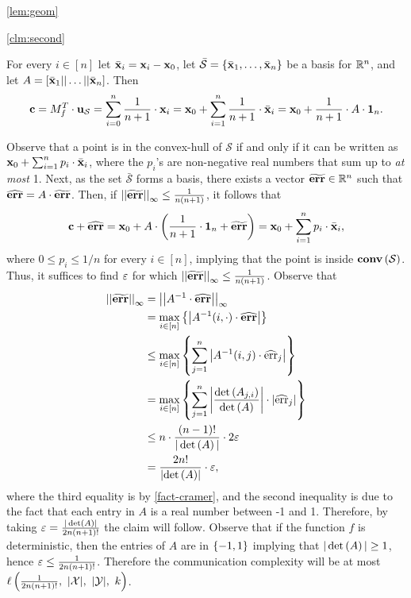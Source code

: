 \documentclass{llncs}
\renewcommand{\S}{\mathcal{S}}
\newcommand{\X}{\mathcal{X}}
\newcommand{\Y}{\mathcal{Y}}
\newcommand{\CH}[1]{\normalfont{\mathbf{conv}\of{#1}}}
\renewcommand{\c}{\myvec{c}}
\newcommand{\x}{\myvec{x}}
\newcommand{\errvec}{\myvec{err}}
\newcommand{\errval}{\operatorname{err}}
\newcommand{\ones}{\normalfont{\textbf{1}}}
\newcommand{\norm}[2]{\left|\left|#1\right|\right|_{#2}}
\renewcommand{\det}[1]{\operatorname{det}\of{#1}}
\begin{document}
\begin{proofof}{\cref{lem:geom}}
\begin{proofof}{\cref{clm:second}}

For every $i\in[n]$ let $\bar{\x}_i=\x_i-\x_{0}$, let $\bar{\S}=\set{\bar{\x}_1,\ldots,\bar{\x}_n}$ be a basis for ${\mathbb R}^n$, and let $A=[\bar{\x}_1||\ldots||\bar{\x}_n]$. Then
$$\c=M_f^T\cdot\myvec{u}_\S=\sum_{i=0}^{n} \frac{1}{n+1}\cdot \x_i=\x_{0}+\sum_{i=1}^n \frac{1}{n+1}\cdot\bar{\x}_i=\x_{0}+\frac{1}{n+1}\cdot A\cdot\ones_n.$$

Observe that a point is in the convex-hull of $\S$ if and only if it can be written as
$\x_{0}+\sum_{i=1}^n p_i\cdot\bar{\x}_i$,
where the $p_i$'s are non-negative real numbers that sum up to \emph{at most} 1. Next, as the set $\bar{\S}$ forms a basis, there exists a vector $\widetilde{\errvec}\in\R^{n}$ such that $\widehat{\errvec}=A\cdot\widetilde{\errvec}$. 
Then, if $\norm{\widetilde{\errvec}}{\infty}\leq\frac{1}{n(n+1)}$, it follows that
$$\c+\widehat{\errvec}=\x_{0}+A\cdot\left(\frac{1}{n+1}\cdot\ones_n+\widetilde{\errvec}\right)=\x_{0}+\sum_{i=1}^n p_i\cdot \bar{\x}_i,$$
where $0\leq p_i\leq 1/n$ for every $i\in[n]$, implying that the point is inside $\CH{\S}$. Thus, it suffices to find $\varepsilon$ for which $\norm{\widetilde{\errvec}}{\infty}\leq\frac{1}{n(n+1)}$. Observe that
\begin{align*}
\norm{\widetilde{\errvec}}{\infty}
&=\norm{A^{-1}\cdot\widehat{\errvec}}{\infty}\\
&=\max_{i\in[n]}\set{\abs{A^{-1}(i,\cdot)\cdot\widehat{\errvec}}}\\
&\leq\max_{i\in[n]}\set{\sum_{j=1}^n\abs{A^{-1}(i,j)\cdot\widehat{\errval}_j}}\\
&=\max_{i\in[n]}\set{\sum_{j=1}^n\abs{\frac{\det{A_{j,i}}}{\det{A}}}\cdot\abs{\widehat{\errval}_j}}\\
&\leq n\cdot\frac{(n-1)!}{|\det{A}|}\cdot 2\eps\\
&=\frac{2n!}{\abs{\det{A}}}\cdot\eps,
\end{align*}
where the third equality is by \cref{fact-cramer}, and the second inequality is due to the fact that each entry in $A$ is a real number between -1 and 1. Therefore, by taking $\eps=\frac{|\det{A}|}{2n(n+1)!}$ the claim will follow. Observe that if the function $f$ is deterministic, then the entries of $A$ are in $\left\{-1,1\right\}$ implying that $|\det{A}|\geq 1$, hence $\varepsilon\leq\frac{1}{2n(n+1)!}$. Therefore the communication complexity will be at most $\ell\of{\frac{1}{2n(n+1)!},~|\X|,~|\Y|,~k}$.


\end{proofof}
\end{proofof}
\end{document}
